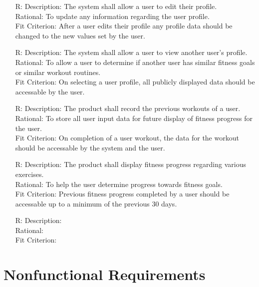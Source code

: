 \documentclass[12pt]{article}
\newcounter{reqnum} %
\begin{document}
\begin{itemize}
\begin{itemize}
		\item[R\refstepcounter{reqnum}\thereqnum \label{R_Inputs}:]
		Description: The system shall allow a user to edit their profile.
		\\ Rational: To update any information regarding the user profile.
		\\ Fit Criterion: After a user edits their profile any profile data should be changed to the new values set by the user.
		
		\item[R\refstepcounter{reqnum}\thereqnum \label{R_Inputs}:]
		Description: The system shall allow a user to view another user's profile.
		\\ Rational: To allow a user to determine if another user has similar fitness goals or similar workout routines.
		\\ Fit Criterion: On selecting a user profile, all publicly displayed data should be accessable by the user.
		
		\item[R\refstepcounter{reqnum}\thereqnum \label{R_Inputs}:]
		Description: The product shall record the previous workouts of a user.
		\\ Rational: To store all user input data for future display of fitness progress for the user. 
		\\ Fit Criterion: On completion of a user workout, the data for the workout should be accessable by the system and the user.
		
		
		\item[R\refstepcounter{reqnum}\thereqnum \label{R_Inputs}:]
		Description: The product shall display fitness progress regarding various exercises.
		\\ Rational: To help the user determine progress towards fitness goals.
		\\ Fit Criterion: Previous fitness progress completed by a user should be accessable up to a minimum of the previous 30 days.
		
		
		\item[R\refstepcounter{reqnum}\thereqnum \label{R_Inputs}:]
		Description: 
		\\ Rational:
		\\ Fit Criterion:
		
	\end{itemize}
	
	
	\section{Nonfunctional Requirements}
	

\end{itemize}
\end{document}
